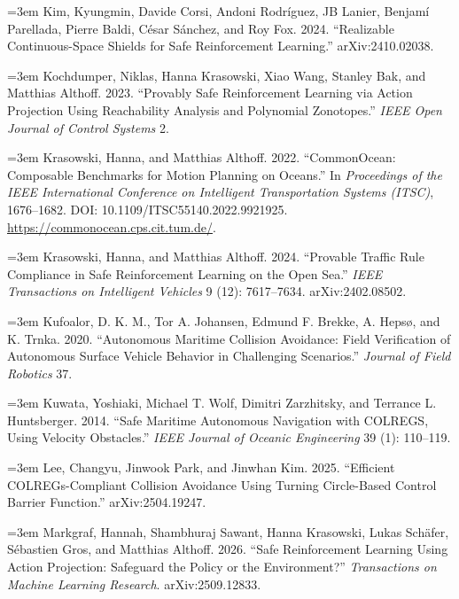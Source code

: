 \documentclass[12pt,letterpaper]{article}
\newcommand{\refitem}[1]{\par\begingroup\emergencystretch=3em\sloppy\noindent\hangindent=0.5in\hangafter=1 #1\par\endgroup}
\begin{document}
\refitem{\hypertarget{ref:kim2024}{}Kim, Kyungmin, Davide Corsi, Andoni Rodríguez, JB Lanier, Benjamí Parellada, Pierre Baldi, César Sánchez, and Roy Fox. 2024. ``Realizable Continuous-Space Shields for Safe Reinforcement Learning.'' arXiv:2410.02038.}

\refitem{\hypertarget{ref:kochdumper2023}{}Kochdumper, Niklas, Hanna Krasowski, Xiao Wang, Stanley Bak, and Matthias Althoff. 2023. ``Provably Safe Reinforcement Learning via Action Projection Using Reachability Analysis and Polynomial Zonotopes.'' \textit{IEEE Open Journal of Control Systems} 2.}


\refitem{\hypertarget{ref:krasowski2022}{}Krasowski, Hanna, and Matthias Althoff. 2022. ``CommonOcean: Composable Benchmarks for Motion Planning on Oceans.'' In \textit{Proceedings of the IEEE International Conference on Intelligent Transportation Systems (ITSC)}, 1676--1682. DOI: 10.1109/ITSC55140.2022.9921925. \url{https://commonocean.cps.cit.tum.de/}.}

\refitem{\hypertarget{ref:krasowski2024}{}Krasowski, Hanna, and Matthias Althoff. 2024. ``Provable Traffic Rule Compliance in Safe Reinforcement Learning on the Open Sea.'' \textit{IEEE Transactions on Intelligent Vehicles} 9 (12): 7617--7634. arXiv:2402.08502.}


\refitem{\hypertarget{ref:kufoalor2020}{}Kufoalor, D. K. M., Tor A. Johansen, Edmund F. Brekke, A. Hepsø, and K. Trnka. 2020. ``Autonomous Maritime Collision Avoidance: Field Verification of Autonomous Surface Vehicle Behavior in Challenging Scenarios.'' \textit{Journal of Field Robotics} 37.}

\refitem{\hypertarget{ref:kuwata2014}{}Kuwata, Yoshiaki, Michael T. Wolf, Dimitri Zarzhitsky, and Terrance L. Huntsberger. 2014. ``Safe Maritime Autonomous Navigation with COLREGS, Using Velocity Obstacles.'' \textit{IEEE Journal of Oceanic Engineering} 39 (1): 110--119.}

\refitem{\hypertarget{ref:lee2025}{}Lee, Changyu, Jinwook Park, and Jinwhan Kim. 2025. ``Efficient COLREGs-Compliant Collision Avoidance Using Turning Circle-Based Control Barrier Function.'' arXiv:2504.19247.}

\refitem{\hypertarget{ref:markgraf2026}{}Markgraf, Hannah, Shambhuraj Sawant, Hanna Krasowski, Lukas Schäfer, Sébastien Gros, and Matthias Althoff. 2026. ``Safe Reinforcement Learning Using Action Projection: Safeguard the Policy or the Environment?'' \textit{Transactions on Machine Learning Research}. arXiv:2509.12833.}
\end{document}
